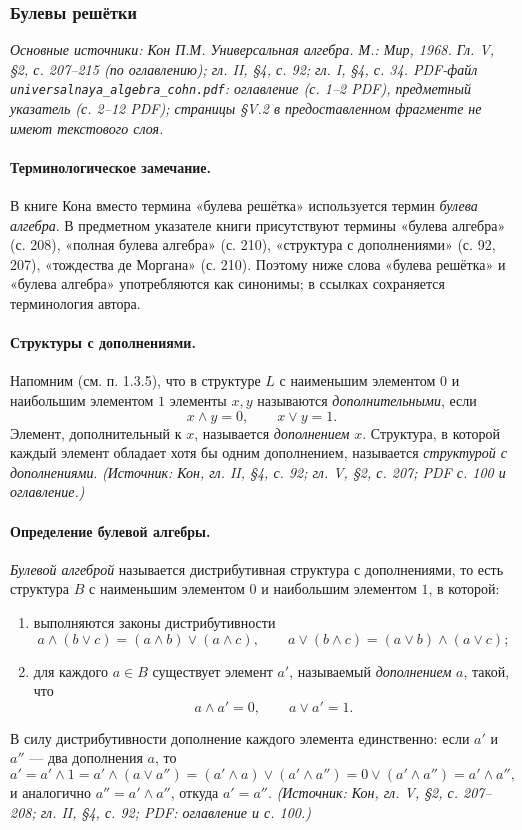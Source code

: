 \documentclass[a4paper,12pt]{article}
\begin{document}
\subsubsection{Булевы решётки}

\noindent\textit{Основные источники: Кон П.М. Универсальная алгебра. М.: Мир, 1968. Гл. V, §2, с. 207--215 (по оглавлению); гл. II, §4, с. 92; гл. I, §4, с. 34. PDF-файл \texttt{universalnaya\_algebra\_cohn.pdf}: оглавление (с. 1--2 PDF), предметный указатель (с. 2--12 PDF); страницы §V.2 в предоставленном фрагменте не имеют текстового слоя.}

\paragraph{Терминологическое замечание.}
В книге Кона вместо термина «булева решётка» используется термин \emph{булева алгебра}. В предметном указателе книги присутствуют термины «булева алгебра» (с. 208), «полная булева алгебра» (с. 210), «структура с дополнениями» (с. 92, 207), «тождества де Моргана» (с. 210). Поэтому ниже слова «булева решётка» и «булева алгебра» употребляются как синонимы; в ссылках сохраняется терминология автора.

\paragraph{Структуры с дополнениями.}
Напомним (см. п. 1.3.5), что в структуре \(L\) с наименьшим элементом \(0\) и наибольшим элементом \(1\) элементы \(x,y\) называются \emph{дополнительными}, если
\[
x\wedge y=0,\qquad x\vee y=1.
\]
Элемент, дополнительный к \(x\), называется \emph{дополнением} \(x\). Структура, в которой каждый элемент обладает хотя бы одним дополнением, называется \emph{структурой с дополнениями}.
\textit{(Источник: Кон, гл. II, §4, с. 92; гл. V, §2, с. 207; PDF с. 100 и оглавление.)}

\paragraph{Определение булевой алгебры.}
\emph{Булевой алгеброй} называется дистрибутивная структура с дополнениями, то есть структура \(B\) с наименьшим элементом \(0\) и наибольшим элементом \(1\), в которой:
\begin{enumerate}[label=(\roman*)]
\item выполняются законы дистрибутивности
\[
a\wedge(b\vee c)=(a\wedge b)\vee(a\wedge c),
\qquad
a\vee(b\wedge c)=(a\vee b)\wedge(a\vee c);
\]
\item для каждого \(a\in B\) существует элемент \(a'\), называемый \emph{дополнением} \(a\), такой, что
\[
a\wedge a'=0,\qquad a\vee a'=1.
\]
\end{enumerate}
В силу дистрибутивности дополнение каждого элемента единственно: если \(a'\) и \(a''\) — два дополнения \(a\), то
\[
a'=a'\wedge1=a'\wedge(a\vee a'')=(a'\wedge a)\vee(a'\wedge a'')=0\vee(a'\wedge a'')=a'\wedge a'',
\]
и аналогично \(a''=a'\wedge a''\), откуда \(a'=a''\).
\textit{(Источник: Кон, гл. V, §2, с. 207--208; гл. II, §4, с. 92; PDF: оглавление и с. 100.)}
\end{document}
